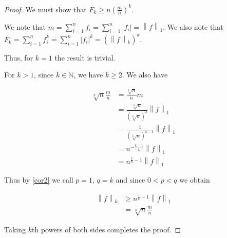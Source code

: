 \documentclass[11pt]{amsart}
\newcommand{\norm}[1]{\left\lVert #1 \right\rVert}
\begin{document}
\begin{proof}
We must show that $F_k \ge n \left(\frac{m}{n}\right)^k$.

We note that $m = \sum_{i=1}^n f_i = \sum_{i=1}^n |f_i| = \norm{f}_1$. We also note that $F_k = \sum_{i=1}^n f_i^k = \sum_{i=1}^n |f_i|^k = \left(\norm{f}_k\right)^k$.

Thus, for $k = 1$ the result is trivial.

For $k > 1$, since $k \in \mathbb{N}$, we have $k \ge 2$. We also have

\begin{align*}
\sqrt[k]{n} \frac{m}{n} &= \frac{\sqrt[k]{n}}{n} m\\
                        &= \frac{\sqrt[k]{n}}{\left(\sqrt[k]{n}\right)^k} \norm{f}_1\\
                        &= \frac{1}{\left(\sqrt[k]{n}\right)^{k-1}} \norm{f}_1\\
                        &= n^{-\frac{k-1}{k}} \norm{f}_1\\
                        &= n^{\frac{1}{k} - 1} \norm{f}_1
\end{align*}

Thus by \ref{cor2} we call $p = 1$, $q = k$ and since $0 < p < q$ we obtain

\begin{align*}
\norm{f}_k &\ge n^{\frac{1}{k} - 1} \norm{f}_1\\
           &= \sqrt[k]{n} \frac{m}{n}
\end{align*}

Taking $k$th powers of both sides completes the proof.
\end{proof}
\end{document}

